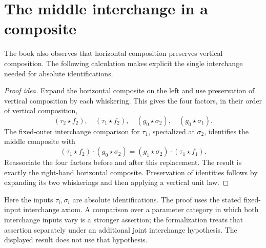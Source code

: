 \documentclass[11pt]{article}
\begin{document}
\section*{The middle interchange in a composite}

The book also observes that horizontal composition preserves vertical
composition. The following calculation makes explicit the single interchange
needed for absolute identifications.

\begin{proof}[Proof idea]
Expand the horizontal composite on the left and use preservation of vertical
composition by each whiskering. This gives the four factors, in their order
of vertical composition,
\[
 (\tau_2\star f_2),\quad(\tau_1\star f_2),\quad
 (g_0\star\sigma_2),\quad(g_0\star\sigma_1).
\]
The fixed-outer interchange comparison for $\tau_1$, specialized at
$\sigma_2$, identifies the middle composite with
\[
 (\tau_1\star f_2)\cdot(g_0\star\sigma_2)
   =(g_1\star\sigma_2)\cdot(\tau_1\star f_1).
\]
Reassociate the four factors before and after this replacement. The result
is exactly the right-hand horizontal composite. Preservation of identities
follows by expanding its two whiskerings and then applying a vertical unit law.
\end{proof}

Here the inputs $\tau_i,\sigma_i$ are absolute identifications. The proof
uses the stated fixed-input interchange axiom. A comparison over a parameter
category in which both interchange inputs vary is a stronger assertion;
the formalization treats that assertion separately under an additional joint
interchange hypothesis. The displayed result does not use that hypothesis.
\end{document}
